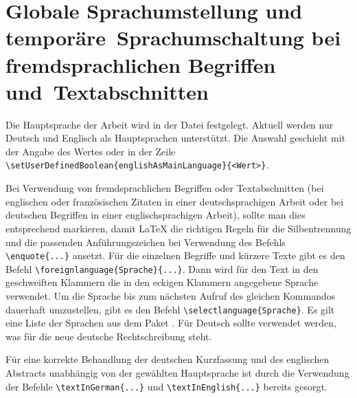 \section[Globale Sprachumstellung und temporäre Sprachumschaltung]{Globale Sprachumstellung und \mbox{temporäre Sprachumschaltung} bei fremdsprachlichen Begriffen \mbox{und Textabschnitten}}%
%
%
%
%
\label{sec:Sprache}
%
Die Hauptsprache der Arbeit wird in der Datei  festgelegt.
Aktuell werden nur Deutsch und Englisch als Hauptsprachen unterstützt.
Die Auswahl geschieht mit der Angabe des Wertes  oder 
in der Zeile \lstinline|\setUserDefinedBoolean{englishAsMainLanguage}{<Wert>}|.

Bei Verwendung von fremdsprachlichen Begriffen oder Textabschnitten
(\zB bei englischen oder französischen Zitaten in einer deutschsprachigen Arbeit
oder bei deutschen Begriffen in einer englischsprachigen Arbeit),
sollte man dies entsprechend markieren,
damit \LaTeX{} die richtigen Regeln für die Silbentrennung
und die passenden Anführungszeichen bei Verwendung des Befehls
\lstinline|\enquote{...}| ansetzt.
Für die einzelnen Begriffe und kürzere Texte gibt es den Befehl
\lstinline|\foreignlanguage{Sprache}{...}|.
Dann wird für den Text in den geschweiften Klammern die in den eckigen Klammern angegebene Sprache verwendet.
Um die Sprache bis zum nächsten Aufruf des gleichen Kommandos dauerhaft umzustellen,
gibt es den Befehl \lstinline|\selectlanguage{Sprache}|.
Es gilt eine Liste der Sprachen aus dem Paket .
Für Deutsch sollte  verwendet werden, was für die
neue deutsche Rechtschreibung steht.

Für eine korrekte Behandlung der deutschen Kurzfassung und des englischen Abstracts
unabhängig von der gewählten Hauptsprache ist durch die Verwendung der Befehle
\lstinline|\textInGerman{...}| und \lstinline|\textInEnglish{...}| bereits gesorgt.